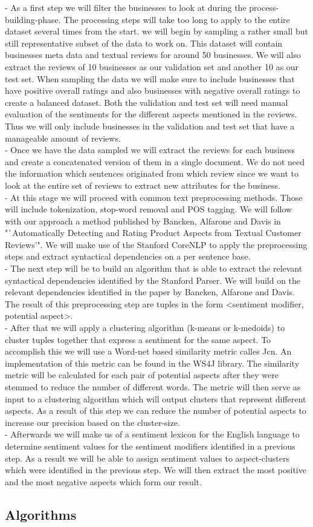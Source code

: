 - As a first step we will filter the businesses to look at during the process-building-phase. The processing steps will take too long to apply to the entire dataset several times from the start. we will begin by sampling a rather small but still representative subset of the data to work on. This dataset will contain businesses meta data and textual reviews for around 50 businesses. We will also extract the reviews of 10 businesses as our validation set and another 10 as our test set. When sampling the data we will make sure to include businesses that have positive overall ratings and also businesses with negative overall ratings to create a balanced dataset. Both the validation and test set will need manual evaluation of the sentiments for the different aspects mentioned in the reviews. Thus we will only include businesses in the validation and test set that have a manageable amount of reviews. \\
- Once we have the data sampled we will extract the reviews for each business and create a concatenated version of them in a single document. We do not need the information which sentences originated from which review since we want to look at the entire set of reviews to extract new attributes for the business.\\
- At this stage we will proceed with common text preprocessing methods. Those will include tokenization, stop-word removal and POS tagging. We will follow with our approach a method published by Bancken, Alfarone and Davis in "`Automatically Detecting and Rating Product Aspects from Textual Customer Reviews'". We will make use of the Stanford CoreNLP to apply the preprocessing steps and extract syntactical dependencies on a per sentence base. \\
- The next step will be to build an algorithm that is able to extract the relevant syntactical dependencies identified by the Stanford Parser. We will build on the relevant dependencies identified in the paper by Bancken, Alfarone and Davis. The result of this preprocessing step are tuples in the form <sentiment modifier, potential aspect>. \\
- After that we will apply a clustering algorithm (k-means or k-medoids) to cluster tuples together that express a sentiment for the same aspect. To accomplish this we will use a Word-net based similarity metric calles Jcn. An implementation of this metric can be found in the WS4J library. The similarity metric will be calculated for each pair of potential aspects after they were stemmed to reduce the number of different words. The metric will then serve as input to a clustering algorithm which will output clusters that represent different aspects. As a result of this step we can reduce the number of potential aspects to increase our precision based on the cluster-size.\\
- Afterwards we will make us of a sentiment lexicon for the English language to determine sentiment values for the sentiment modifiers identified in a previous step. As a result we will be able to assign sentiment values to aspect-clusters which were identified in the previous step. We will then extract the most positive and the most negative aspects which form our result.

\subsection{Algorithms}
\label{sec:algorithms}